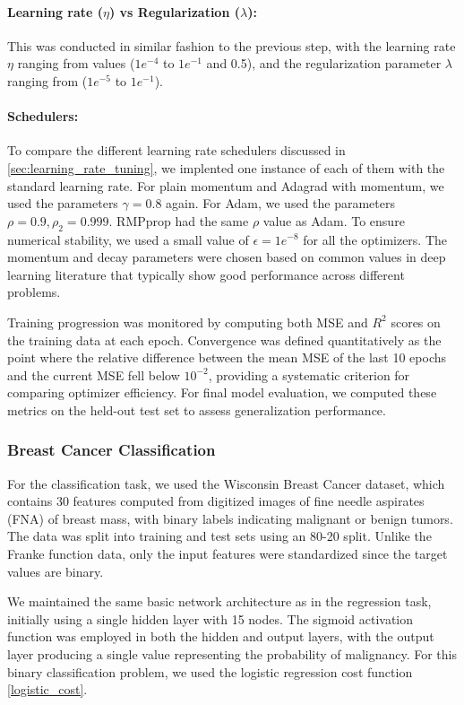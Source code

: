 \documentclass[aps,pra,english,notitlepage,reprint,nofootinbib]{revtex4-1}  %
\begin{document}
\paragraph*{Learning rate (\( \eta \)) vs Regularization (\( \lambda \)):}
This was conducted in similar fashion to the previous step, with the learning rate \( \eta \) ranging from values (\( 1e^{-4} \) to \( 1e^{-1} \) and 0.5), and the regularization parameter \( \lambda \) ranging from (\( 1e^{-5} \) to \( 1e^{-1} \)).

\paragraph*{Schedulers:}
To compare the different learning rate schedulers discussed in \cref{sec:learning_rate_tuning}, we implented one instance of each of them with the standard learning rate. For plain momentum and Adagrad with momentum, we used the parameters \( \gamma = 0.8 \) again. For Adam, we used the parameters \( \rho = 0.9, \rho_2 = 0.999 \). RMPprop had the same \( \rho \) value as Adam. To ensure numerical stability, we used a small value of \( \epsilon = 1e^{-8} \) for all the optimizers. The momentum and decay parameters were chosen based on common values in deep learning literature that typically show good performance across different problems. %

Training progression was monitored by computing both MSE and \( R^2 \) scores on the training data at each epoch. Convergence was defined quantitatively as the point where the relative difference between the mean MSE of the last 10 epochs and the current MSE fell below \( 10^{-2} \), providing a systematic criterion for comparing optimizer efficiency. For final model evaluation, we computed these metrics on the held-out test set to assess generalization performance.
\subsubsection{Breast Cancer Classification}

For the classification task, we used the Wisconsin Breast Cancer dataset, which contains 30 features computed from digitized images of fine needle aspirates (FNA) of breast mass, with binary labels indicating malignant or benign tumors. The data was split into training and test sets using an 80-20 split. Unlike the Franke function data, only the input features were standardized since the target values are binary.

We maintained the same basic network architecture as in the regression task, initially using a single hidden layer with 15 nodes. The sigmoid activation function was employed in both the hidden and output layers, with the output layer producing a single value representing the probability of malignancy. For this binary classification problem, we used the logistic regression cost function \cref{logistic_cost}.
\end{document}
